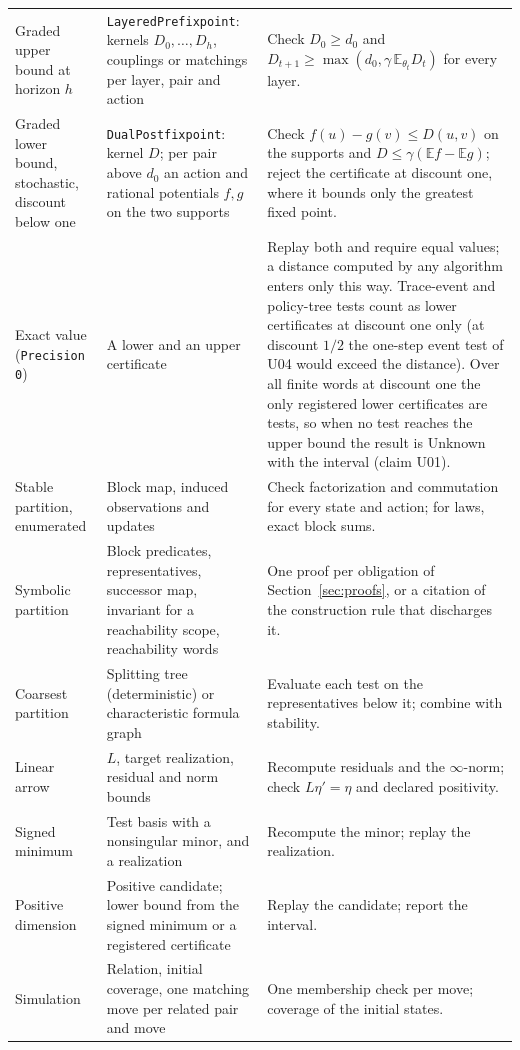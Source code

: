 \documentclass[11pt]{article}
\newcommand{\code}[1]{\texttt{#1}}
\begin{document}
\begin{longtable}{>{\raggedright\arraybackslash}p{3.4cm}>{\raggedright\arraybackslash}p{5.0cm}>{\raggedright\arraybackslash}p{5.4cm}}
Graded upper bound at horizon $h$ & \code{LayeredPrefixpoint}: kernels $D_0,\dots,D_h$, couplings or matchings per layer, pair and action & Check $D_0\ge d_0$ and $D_{t+1}\ge\max(d_0,\gamma\,\mathbb E_{\theta_t}D_t)$ for every layer.\\
Graded lower bound, stochastic, discount below one & \code{DualPostfixpoint}: kernel $D$; per pair above $d_0$ an action and rational potentials $f,g$ on the two supports & Check $f(u)-g(v)\le D(u,v)$ on the supports and $D\le\gamma(\mathbb E f-\mathbb E g)$; reject the certificate at discount one, where it bounds only the greatest fixed point.\\
Exact value (\code{Precision 0}) & A lower and an upper certificate & Replay both and require equal values; a distance computed by any algorithm enters only this way. Trace-event and policy-tree tests count as lower certificates at discount one only (at discount $1/2$ the one-step event test of U04 would exceed the distance). Over all finite words at discount one the only registered lower certificates are tests, so when no test reaches the upper bound the result is Unknown with the interval (claim U01).\\
Stable partition, enumerated & Block map, induced observations and updates & Check factorization and commutation for every state and action; for laws, exact block sums.\\
Symbolic partition & Block predicates, representatives, successor map, invariant for a reachability scope, reachability words & One proof per obligation of Section~\ref{sec:proofs}, or a citation of the construction rule that discharges it.\\
Coarsest partition & Splitting tree (deterministic) or characteristic formula graph & Evaluate each test on the representatives below it; combine with stability.\\
Linear arrow & $L$, target realization, residual and norm bounds & Recompute residuals and the $\infty$-norm; check $L\eta'=\eta$ and declared positivity.\\
Signed minimum & Test basis with a nonsingular minor, and a realization & Recompute the minor; replay the realization.\\
Positive dimension & Positive candidate; lower bound from the signed minimum or a registered certificate & Replay the candidate; report the interval.\\
Simulation & Relation, initial coverage, one matching move per related pair and move & One membership check per move; coverage of the initial states.\\

\end{longtable}
\end{document}

